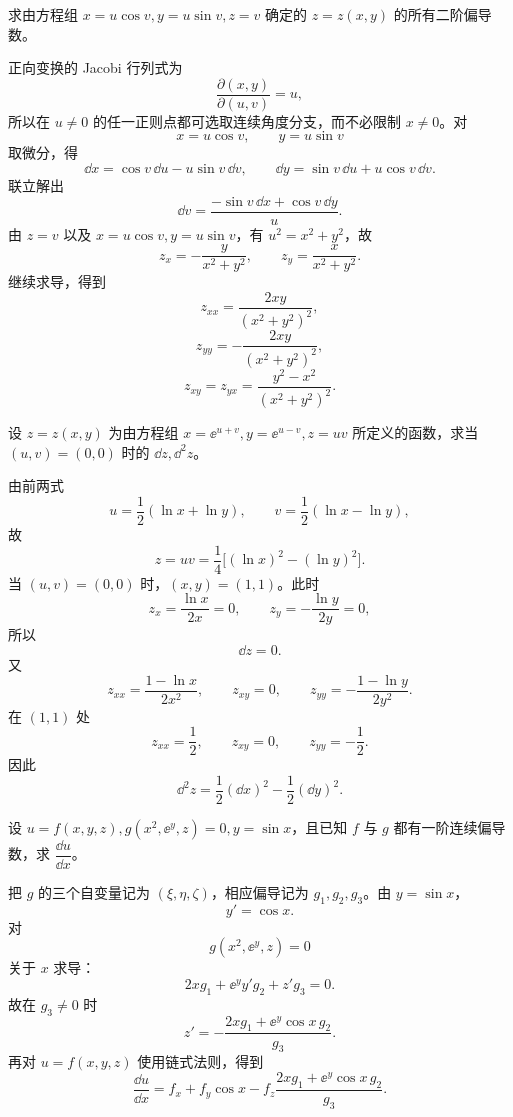 \begin{xexercise}[6]
求由方程组 $x=u\cos v,y=u\sin v,z=v$ 确定的 $z=z(x,y)$ 的所有二阶偏导数。
\end{xexercise}
\begin{xsolution}
正向变换的 Jacobi 行列式为
\[
  \frac{\partial(x,y)}{\partial(u,v)}=u,
\]
所以在 $u\ne0$ 的任一正则点都可选取连续角度分支，而不必限制 $x\ne0$。对
\[
  x=u\cos v,\qquad y=u\sin v
\]
取微分，得
\[
  \dd x=\cos v\,\dd u-u\sin v\,\dd v,
  \qquad
  \dd y=\sin v\,\dd u+u\cos v\,\dd v.
\]
联立解出
\[
  \dd v=\frac{-\sin v\,\dd x+\cos v\,\dd y}{u}.
\]
由 $z=v$ 以及 $x=u\cos v,y=u\sin v$，有 $u^2=x^2+y^2$，故
\[
  z_x=-\frac{y}{x^2+y^2},
  \qquad
  z_y=\frac{x}{x^2+y^2}.
\]
继续求导，得到
\[
  \boxed{\displaystyle
    z_{xx}=\frac{2xy}{(x^2+y^2)^2}},
\]
\[
  \boxed{\displaystyle
    z_{yy}=-\frac{2xy}{(x^2+y^2)^2}},
\]
\[
  \boxed{\displaystyle
    z_{xy}=z_{yx}=\frac{y^2-x^2}{(x^2+y^2)^2}}.
\]
\end{xsolution}


\begin{xexercise}[7]
设 $z=z(x,y)$ 为由方程组 $x=\ee^{u+v},y=\ee^{u-v},z=uv$ 所定义的函数，求当 $(u,v)=(0,0)$ 时的 $\dd z,\dd^2z$。
\end{xexercise}
\begin{xsolution}
由前两式
\[
  u=\frac12(\ln x+\ln y),
  \qquad
  v=\frac12(\ln x-\ln y),
\]
故
\[
  z=uv=\frac14\bigl[(\ln x)^2-(\ln y)^2\bigr].
\]
当 $(u,v)=(0,0)$ 时，$(x,y)=(1,1)$。此时
\[
  z_x=\frac{\ln x}{2x}=0,
  \qquad
  z_y=-\frac{\ln y}{2y}=0,
\]
所以
\[
  \boxed{\dd z=0}.
\]
又
\[
  z_{xx}=\frac{1-\ln x}{2x^2},
  \qquad z_{xy}=0,
  \qquad
  z_{yy}=-\frac{1-\ln y}{2y^2}.
\]
在 $(1,1)$ 处
\[
  z_{xx}=\frac12,
  \qquad z_{xy}=0,
  \qquad z_{yy}=-\frac12.
\]
因此
\[
  \boxed{\displaystyle
    \dd^2z=\frac12(\dd x)^2-\frac12(\dd y)^2}.
\]
\end{xsolution}


\begin{xexercise}[8]
设 $u=f(x,y,z),g(x^2,\ee^y,z)=0,y=\sin x$，且已知 $f$ 与 $g$ 都有一阶连续偏导数，求 $\dfrac{\dd u}{\dd x}$。
\end{xexercise}
\begin{xsolution}
把 $g$ 的三个自变量记为 $(\xi,\eta,\zeta)$，相应偏导记为 $g_1,g_2,g_3$。由 $y=\sin x$，
\[
  y'=\cos x.
\]
对
\[
  g(x^2,\ee^y,z)=0
\]
关于 $x$ 求导：
\[
  2xg_1+\ee^y y'g_2+z'g_3=0.
\]
故在 $g_3\ne0$ 时
\[
  z'=-\frac{2xg_1+\ee^y\cos x\,g_2}{g_3}.
\]
再对 $u=f(x,y,z)$ 使用链式法则，得到
\[
  \boxed{\displaystyle
  \frac{\dd u}{\dd x}
  =f_x+f_y\cos x
   -f_z\frac{2xg_1+\ee^y\cos x\,g_2}{g_3}}.
\]
\end{xsolution}


